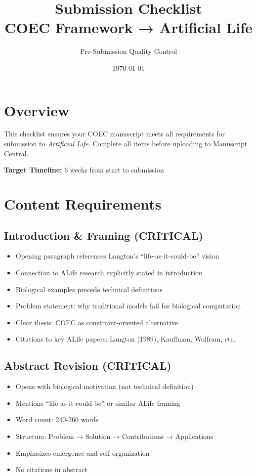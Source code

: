 \documentclass[11pt]{article}
\title{\textbf{Submission Checklist}\\
\large COEC Framework → Artificial Life}
\author{Pre-Submission Quality Control}
\date{\today}
\begin{document}
\maketitle

\section*{Overview}

This checklist ensures your COEC manuscript meets all requirements for submission to \textit{Artificial Life}. Complete all items before uploading to Manuscript Central.

\textbf{Target Timeline:} 6 weeks from start to submission

\section{Content Requirements}

\subsection{Introduction \& Framing (\textcolor{urgent}{CRITICAL})}

\begin{itemize}[label=$\square$]
    \item Opening paragraph references Langton's ``life-as-it-could-be'' vision
    \item Connection to ALife research explicitly stated in introduction
    \item Biological examples precede technical definitions
    \item Problem statement: why traditional models fail for biological computation
    \item Clear thesis: COEC as constraint-oriented alternative
    \item Citations to key ALife papers: Langton (1989), Kauffman, Wolfram, etc.
\end{itemize}

\subsection{Abstract Revision (\textcolor{urgent}{CRITICAL})}

\begin{itemize}[label=$\square$]
    \item Opens with biological motivation (not technical definition)
    \item Mentions ``life-as-it-could-be'' or similar ALife framing
    \item Word count: 240-260 words
    \item Structure: Problem → Solution → Contributions → Applications
    \item Emphasizes emergence and self-organization
    \item No citations in abstract
\end{itemize}
\end{document}
